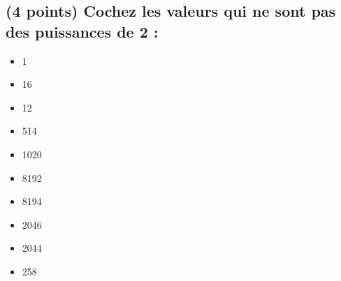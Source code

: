 \documentclass[11pt,a4paper]{article}
\begin{document}
\MakeExamTitle                   %




\renewcommand{\thesubsection}{\arabic{subsection}} %




\subsection{(4 points) Cochez les valeurs qui ne sont pas des puissances de 2 : }

\begin{table}[h!]
  \centering
  \begin{minipage}{0.45\textwidth}
\begin{itemize}
  \item[\CaseCoche] 1      \phantom{(} \\
  \item[\CaseCoche] 16     \phantom{(} \\
  \item[\CaseCoche] 12     \phantom{(} \\
  \item[\CaseCoche] 514    \phantom{(} \\
  \item[\CaseCoche] 1020   \phantom{(} \\
\end{itemize}
  \end{minipage}
  \hfillx
  \begin{minipage}{0.45\textwidth}
    \centering
\begin{itemize}
  \item[\CaseCoche] 8192   \phantom{(} \\
  \item[\CaseCoche] 8194   \phantom{(} \\
  \item[\CaseCoche] 2046   \phantom{(} \\
  \item[\CaseCoche] 2044   \phantom{(} \\
  \item[\CaseCoche] 258    \phantom{(} \\
\end{itemize}
  \end{minipage}
\end{table}
\end{document}
